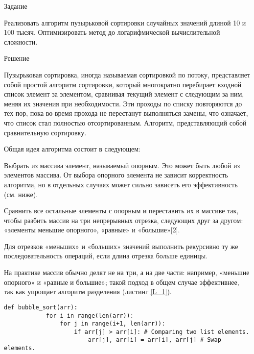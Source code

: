\documentclass[oneside,14pt]{extarticle} %
\begin{document}
\begin{titlepage}
\begin{flushleft}
		\end{flushleft}
		\vfill
		\begin{center}
			
			\fontsize{12}{12}\selectfont{Старый Оскол, \yeardate\today}
			
		\end{center}
			
	\end{titlepage}
	\setcounter{page}{2}
	
	\begin{center}
		Задание
	\end{center}
	
	Реализовать алгоритм пузырьковой сортировки случайных значений длиной 10 и 100 тысяч. Оптимизировать метод до логарифмической вычислительной сложности.
	
	\begin{center}
		Решение
	\end{center}
	
	Пузырьковая сортировка, иногда называемая сортировкой по потоку, представляет собой простой алгоритм сортировки, который многократно перебирает входной список элемент за элементом, сравнивая текущий элемент с следующим за ним, меняя их значения при необходимости. Эти проходы по списку повторяются до тех пор, пока во время прохода не перестанут выполняться замены, что означает, что список стал полностью отсортированным. Алгоритм, представляющий собой сравнительную сортировку.
	
	Общая идея алгоритма состоит в следующем:
	
	Выбрать из массива элемент, называемый опорным. Это может быть любой из элементов массива. От выбора опорного элемента не зависит корректность алгоритма, но в отдельных случаях может сильно зависеть его эффективность (см. ниже).
	
	Сравнить все остальные элементы с опорным и переставить их в массиве так, чтобы разбить массив на три непрерывных отрезка, следующих друг за другом: «элементы меньшие опорного», «равные» и «большие»[2].
	
	Для отрезков «меньших» и «больших» значений выполнить рекурсивно ту же последовательность операций, если длина отрезка больше единицы.
	
	На практике массив обычно делят не на три, а на две части: например, «меньшие опорного» и «равные и большие»; такой подход в общем случае эффективнее, так как упрощает алгоритм разделения (листинг \ref{L_1}).
	
	\begin{lstlisting}[caption={Алгоритм пузырьковой сортировки}]
		def bubble_sort(arr):
			for i in range(len(arr)):
				for j in range(i+1, len(arr)):
					if arr[j] > arr[i]: # Comparing two list elements.
						arr[j], arr[i] = arr[i], arr[j] # Swap elements.
	\end{lstlisting}\label{L_1}
	
\end{document}
